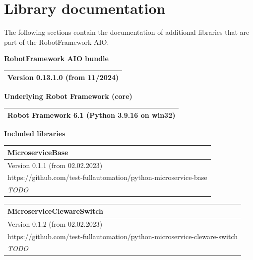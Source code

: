 
\chapter{Library documentation}

The following sections contain the documentation of additional libraries that are part of the RobotFramework AIO.

\vspace{2ex}

\begin{center}
{\Large\textbf{RobotFramework AIO bundle}}

\vspace{2ex}

\begin{tabular}{| m{44em} |}\hline
   Version 0.13.1.0 (from 11/2024)\\ \hline
\end{tabular}

\vspace{2ex}

\vspace{2ex}
{\Large\textbf{Underlying Robot Framework (core)}}

\vspace{2ex}

\begin{tabular}{| m{44em} |}\hline
Robot Framework 6.1 (Python 3.9.16 on win32)\\ \hline
\end{tabular}

\vspace{2ex}

\vspace{2ex}
{\Large\textbf{Included libraries}}

\vspace{2ex}

\begin{tabular}{| m{44em} |}\hline
   \textbf{MicroserviceBase}\\ \hline
   Version 0.1.1 (from 02.02.2023)\\ \hline
   https://github.com/test-fullautomation/python-microservice-base\\ \hline
   \textit{TODO}\\ \hline
\end{tabular}

\vspace{2ex}

\begin{tabular}{| m{44em} |}\hline
   \textbf{MicroserviceClewareSwitch}\\ \hline
   Version 0.1.2 (from 02.02.2023)\\ \hline
   https://github.com/test-fullautomation/python-microservice-cleware-switch\\ \hline
   \textit{TODO}\\ \hline
\end{tabular}

\vspace{2ex}

\end{center}

